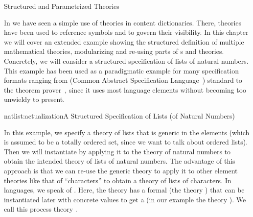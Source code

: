 
\begin{tchapter}[id=natlist]{Structured and Parametrized Theories}
  
In {} we have seen a simple use of theories in {\openmath} content
dictionaries. There, theories have been used to reference {\openmath} symbols and to
govern their visibility. In this chapter we will cover an extended example showing the
structured definition of multiple mathematical theories, modularizing and re-using parts
of {s} and theories.  Concretely, we will consider a
structured specification of lists of natural numbers. This example has been used as a
paradigmatic example for many specification formats ranging from {\casl} (Common Abstract
Specification Language~\cite{CoFI:2004:CASL-RM}) standard to the {\pvs} theorem prover~\cite{OwRu92},
since it uses most language elements without becoming too unwieldy to present.

\begin{myfig}{natlist:actualization}{A Structured Specification of Lists (of
    Natural Numbers)}
  \begin{tikzpicture}\end{tikzpicture}
\end{myfig}

In this example, we specify a theory {} of lists that is generic in the
elements (which is assumed to be a totally ordered set, since we want to talk about
ordered lists).  Then we will instantiate {} by applying it to the theory
{} of natural numbers to obtain the intended theory {} of
lists of natural numbers.  The advantage of this approach is that we can re-use the
generic theory {} to apply it to other element theories like that of
``characters'' to obtain a theory of lists of characters.  In
{} languages, we speak of {}.  Here, the theory {} has a formal
{} (the theory {}) that can be instantiated later with
concrete values to get a {} (in our example the theory
{}).  We call this process theory {}.


\end{tchapter}
